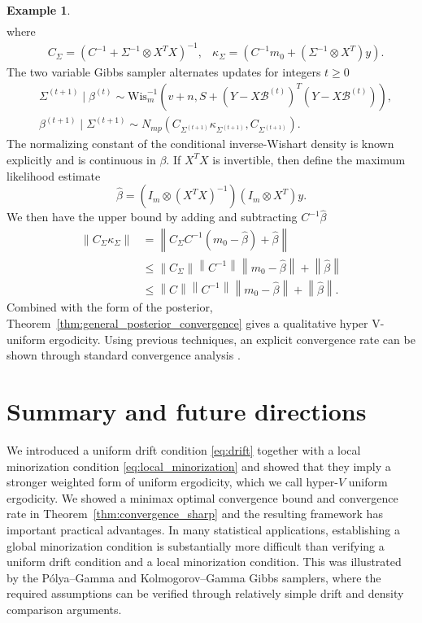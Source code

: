 \documentclass[ejsv2, noshowframe]{imsart}
\theoremstyle{plain}
\theoremstyle{definition}
\newtheorem*{example}{Example}
\theoremstyle{remark}
\newcommand{\norm}[1]{\left\lVert#1\right\rVert}
\newcommand{\B}{\mathcal{B}}
\begin{document}
\begin{example}
\begin{align*}
\end{align*}
where
\begin{align*}
&C_{\Sigma} = \left( C^{-1} + \Sigma^{-1} \otimes X^T X \right)^{-1},
&\kappa_{\Sigma} = \left( C^{-1} m_0 + ( \Sigma^{-1} \otimes X^T ) y \right).
\end{align*}
The two variable Gibbs sampler alternates updates for integers $t \ge 0$
\begin{align*}
&\Sigma^{(t + 1)} \mid \beta^{(t)} \sim \text{Wis}_m^{-1}(v + n, S + (Y - X \B^{(t)})^T (Y - X \B^{(t)}) ),
\\
&\beta^{(t + 1)} \mid \Sigma^{(t + 1)} \sim N_{mp}\left( C_{\Sigma^{(t+1)}} \kappa_{\Sigma^{(t+1)}}, C_{\Sigma^{(t+1)}} \right).
\end{align*}
The normalizing constant of the conditional inverse-Wishart density is known explicitly and is continuous in $\beta$.
If $X^T X$ is invertible, then define the maximum likelihood estimate
\[
\hat{\beta} = (I_m \otimes (X^T X)^{-1}) (I_m \otimes X^T) y.
\]
We then have the upper bound by adding and subtracting $C^{-1} \hat{\beta}$
\begin{align*}
\norm{ C_{\Sigma} \kappa_{\Sigma} }
&= \norm{ C_{\Sigma } C^{-1} ( m_0 - \hat{\beta} ) + \hat{\beta} }
\\
&\le \norm{ C_{ \Sigma } } \norm{ C^{-1} } \norm{ m_0 - \hat{\beta} } + \norm{\hat{\beta} }
\\
&\le \norm{ C } \norm{ C^{-1} } \norm{ m_0 - \hat{\beta} } + \norm{\hat{\beta} }.
\end{align*}
Combined with the form of the posterior, Theorem~\ref{thm:general_posterior_convergence} gives a qualitative hyper V-uniform ergodicity.
Using previous techniques, an explicit convergence rate can be shown through standard convergence analysis \citep[Lemma 4.1]{Ekvall:Jones:2021}.
\end{example}

\section{Summary and future directions} \label{section:conclusion}

We introduced a uniform drift condition \eqref{eq:drift} together with a local minorization condition \eqref{eq:local_minorization} and showed that they imply a stronger weighted form of uniform ergodicity, which we call hyper-$V$ uniform ergodicity. 
We showed a minimax optimal convergence bound and convergence rate in Theorem~\ref{thm:convergence_sharp} and the resulting framework has important practical advantages. 
In many statistical applications, establishing a global minorization condition is substantially more difficult than verifying a uniform drift condition and a local minorization condition. This was illustrated by the P\'olya--Gamma and Kolmogorov--Gamma Gibbs samplers, where the required assumptions can be verified through relatively simple drift and density comparison arguments. 
\end{document}
